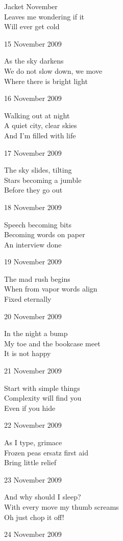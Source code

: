 \documentclass[12pt]{article}
\begin{document}
Jacket November \\
Leaves me wondering if it \\
Will ever get cold

15 November 2009 

As the sky darkens \\
We do not slow down, we move \\
Where there is bright light

16 November 2009

Walking out at night \\
A quiet city, clear skies \\
And I'm filled with life

\newpage

17 November 2009

The sky slides, tilting \\
Stars becoming a jumble \\
Before they go out

18 November 2009

Speech becoming bits \\
Becoming words on paper \\
An interview done

19 November 2009

The mad rush begins \\
When from vapor words align \\
Fixed eternally

20 November 2009

In the night a bump \\
My toe and the bookcase meet \\
It is not happy

21 November 2009

Start with simple things \\
Complexity will find you \\
Even if you hide

22 November 2009

As I type, grimace \\
Frozen peas ersatz first aid \\
Bring little relief

23 November 2009

And why should I sleep? \\
With every move my thumb screams \\
Oh just chop it off!

\newpage

24 November 2009
\end{document}
